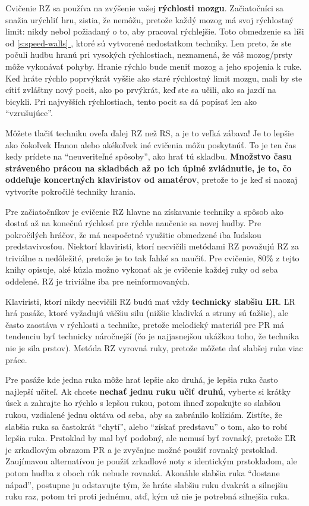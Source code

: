 \documentclass[11pt,a4paper]{book}
\newcommand*{\fullref}[1]{\hyperref[{#1}]{\ref*{#1} \nameref*{#1}}} %
\begin{document}
Cvičenie RZ sa používa na zvýšenie vašej \textbf{rýchlosti mozgu}. Začiatočníci sa snažia urýchliť hru, zistia, že nemôžu, pretože každý ​​mozog má svoj rýchlostný limit: nikdy nebol požiadaný o to, aby pracoval rýchlejšie. Toto obmedzenie sa líši od \fullref{s:speed-walls}, ktoré sú vytvorené nedostatkom techniky. Len preto, že ste počuli hudbu hranú pri vysokých rýchlostiach, neznamená, že váš mozog/prsty môže vykonávať pohyby. Hranie rýchlo bude meniť mozog a jeho spojenia k ruke. Keď hráte rýchlo poprvýkrát vyššie ako staré rýchlostný limit mozgu, mali by ste cítiť zvláštny nový pocit, ako po prvýkrát, keď ste sa učili, ako sa jazdí na bicykli. Pri najvyšších rýchlostiach, tento pocit sa dá popísať len ako “vzrušujúce”.

Môžete tlačiť techniku ​​oveľa ďalej RZ než RS, a je to veľká zábava! Je to lepšie ako čokoľvek Hanon alebo akékoľvek iné cvičenia môžu poskytnúť. To je ten čas kedy prídete na “neuveriteľné spôsoby”, ako  hrať tú skladbu. \textbf{Množstvo času stráveného ​​prácou na skladbách až po ich úplné zvládnutie, je to, čo oddeľuje koncertných klaviristov od amatérov}, pretože to je keď si naozaj vytvoríte pokročilé techniky hrania.

Pre začiatočníkov je cvičenie RZ hlavne na získavanie techniky ​​a spôsob ako dostať až na konečnú rýchlosť pre rýchle naučenie sa novej hudby. Pre pokročilých hráčov, že má nespočetné využitie obmedzené iba ľudskou predstavivosťou. Niektorí klaviristi, ktorí necvičili metódami RZ považujú RZ za triviálne a nedôležité, pretože je to tak ľahké sa naučiť. Pre cvičenie, 80\% z tejto knihy opisuje, aké kúzla možno vykonať ak je cvičenie každej ruky od seba oddelené. RZ je triviálne iba pre neinformovaných.

Klaviristi, ktorí nikdy necvičili RZ budú mať vždy \textbf{technicky slabšiu ĽR}. ĽR hrá pasáže, ktoré vyžadujú väčšiu silu (nižšie kladivká a struny sú ťažšie), ale často zaostáva v rýchlosti a technike, pretože melodický materiál pre PR má tendenciu byť technicky náročnejší (čo je najjasnejšou ukážkou toho, že technika nie je sila prstov). Metóda RZ vyrovná ruky, pretože môžete dať slabšej ruke viac práce.

Pre pasáže kde jedna ruka môže hrať lepšie ako druhá, je lepšia ruka často najlepší učiteľ. Ak chcete \textbf{nechať jednu ruku učiť druhú}, vyberte si krátky úsek a zahrajte ho rýchlo s lepšou rukou, potom ihneď zopakujte so slabšou rukou, vzdialené jednu oktáva od seba, aby sa zabránilo kolíziám. Zistíte, že slabšia ruka sa častokrát “chytí”, alebo “získať predstavu” o tom, ako to robí lepšia ruka. Prstoklad by mal byť podobný, ale nemusí byť rovnaký, pretože ĽR je zrkadlovým obrazom PR a je zvyčajne možné použiť rovnaký prstoklad. Zaujímavou alternatívou je použiť zrkadlové noty s identickým prstokladom, ale potom hudba z oboch rúk nebude rovnaká. Akonáhle slabšia ruka “dostane nápad”, postupne ju odstavujte tým, že hráte slabšiu ruku dvakrát a silnejšiu ruku raz, potom tri proti jednému, atď, kým už nie je potrebná silnejšia ruka.
\end{document}
